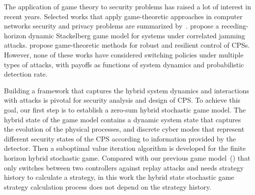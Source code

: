 The application of game theory to security problems has raised a lot of interest in recent years. Selected works that apply game-theoretic approaches in computer networks security and privacy problems are summarized by~\cite{gt_ns}. \cite{MartZhu_game} propose a receding-horizon dynamic Stackelberg game model for systems under correlated jamming attacks. \cite{Basar_2015} propose game-theoretic methods for robust and resilient control of CPSs. However, none of these works have considered switching policies under multiple types of attacks, with payoffs as functions of system dynamics and probabilistic detection rate.%

Building a framework that captures the hybrid system dynamics and interactions with attacks is pivotal for security analysis and design of CPS. To achieve this goal, our first step is to establish a zero-sum hybrid stochastic game model. The hybrid state of the game model contains a dynamic system state that captures the evolution of the physical processes, and discrete cyber modes that represent different security states of the CPS according to information provided by the detector. Then a suboptimal value iteration algorithm is developed for the finite horizon hybrid stochastic game. Compared with our previous game model~(\cite{cdc_replay}) that only switches between two controllers against replay attacks and needs strategy history to calculate a strategy, in this work the hybrid state stochastic game strategy calculation process does not depend on the strategy history. %

